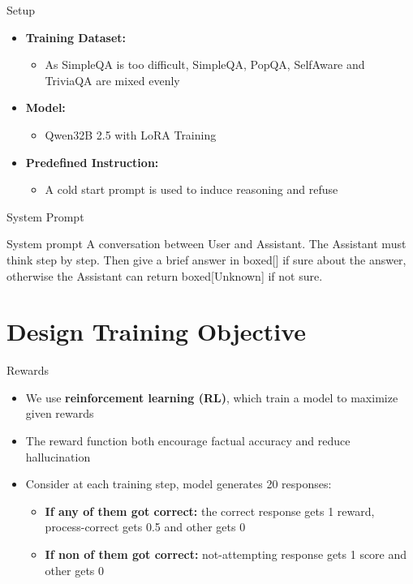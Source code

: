 \documentclass[aspectratio=169]{beamer}
\begin{document}
\begin{frame}{Setup}
    \begin{itemize}
        \item \textbf{Training Dataset:} 
        \begin{itemize}
            \item As SimpleQA is too difficult, SimpleQA, PopQA, SelfAware and TriviaQA are mixed evenly
        \end{itemize}
        \item \textbf{Model:} 
        \begin{itemize}
            \item Qwen32B 2.5 with LoRA Training
        \end{itemize}
        \item \textbf{Predefined Instruction:} 
        \begin{itemize}
            \item A cold start prompt is used to induce reasoning and refuse
        \end{itemize}
    \end{itemize}
\end{frame}

\begin{frame}{System Prompt}
    \begin{block}{System prompt}
        A conversation between User and Assistant. The Assistant must think step by step. Then give a brief answer in boxed[] if sure about the answer, otherwise the Assistant can return boxed[Unknown] if not sure.
    \end{block}
\end{frame}

\section{Design Training Objective}
\begin{frame}{Rewards}
    \begin{itemize}
        \item We use \textbf{reinforcement learning (RL)}, which train a model to maximize given rewards
        \item The reward function both encourage factual accuracy and reduce hallucination
        \item Consider at each training step, model generates 20 responses:
        \begin{itemize}
            \item \textbf{If any of them got correct:} the correct response gets 1 reward, process-correct gets 0.5 and other gets 0
            \item \textbf{If non of them got correct:} not-attempting response gets 1 score and other gets 0
        \end{itemize}
    \end{itemize}
\end{frame}
\end{document}
